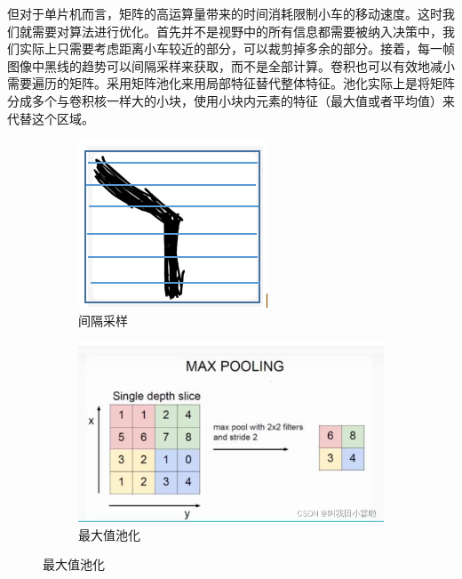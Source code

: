 \documentclass{report}
\begin{document}
但对于单片机而言，矩阵的高运算量带来的时间消耗限制小车的移动速度。这时我们就需要对算法进行优化。首先并不是视野中的所有信息都需要被纳入决策中，我们实际上只需要考虑距离小车较近的部分，可以裁剪掉多余的部分。接着，每一帧图像中黑线的趋势可以间隔采样来获取，而不是全部计算。卷积也可以有效地减小需要遍历的矩阵。采用矩阵池化来用局部特征替代整体特征。池化实际上是将矩阵分成多个与卷积核一样大的小块，使用小块内元素的特征（最大值或者平均值）来代替这个区域。
\begin{figure}[ht]
  \centering
 \begin{subfigure}[b]{0.4\textwidth}
   \centering
   \includegraphics[width=\textwidth]{figures/jumpscan.png}
   \caption{间隔采样}
   \label{fig:label}
 \end{subfigure}
 \hfill
 \begin{subfigure}[b]{0.4\textwidth}
   \centering
   \includegraphics[width=\textwidth]{figures/pooling.png}
   \caption{最大值池化}
   \label{fig:label}
 \end{subfigure}
 \hfill

\end{figure}
\newpage
\end{document}
